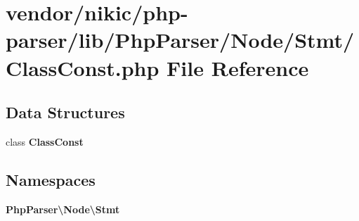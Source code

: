 \section{vendor/nikic/php-\/parser/lib/\+Php\+Parser/\+Node/\+Stmt/\+Class\+Const.php File Reference}
\label{_class_const_8php}
\subsection*{Data Structures}
\begin{DoxyCompactItemize}
\item 
class {\bf Class\+Const}
\end{DoxyCompactItemize}
\subsection*{Namespaces}
\begin{DoxyCompactItemize}
\item 
 {\bf Php\+Parser\textbackslash{}\+Node\textbackslash{}\+Stmt}
\end{DoxyCompactItemize}
